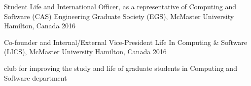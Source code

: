 

\begin{cventries}

  \cventry
    {Student Life and International Officer, as a representative of Computing and Software (CAS)} %
    {Engineering Graduate Society (EGS), McMaster University} %
    {Hamilton, Canada} %
    {2016} %
    {}

  \cventry
    {Co-founder and Internal/External Vice-President} %
    {Life In Computing \& Software (LICS), McMaster University} %
    {Hamilton, Canada} %
    {2016} %
    {
      \begin{cvitems} %
        \item {club for improving the study and life of graduate students in Computing and Software department}
      \end{cvitems}
    }



\end{cventries}
